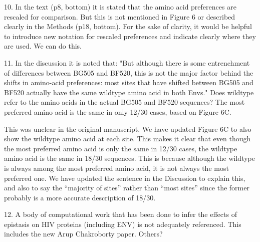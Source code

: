 \documentclass[11pt, oneside]{article}   	%
\begin{document}
10. In the text (p8, bottom) it is stated that the amino acid preferences are rescaled for comparison. But this is not mentioned in Figure 6 or described clearly in the Methods (p18, bottom). For the sake of clarity, it would be helpful to introduce new notation for rescaled preferences and indicate clearly where they are used. 
{\color{red}
We can do this.}

11. In the discussion it is noted that: "But although there is some entrenchment of differences between BG505 and BF520, this is not the major factor behind the shifts in amino-acid preferences: most sites that have shifted between BG505 and BF520 actually have the same wildtype amino acid in both Envs." Does wildtype refer to the amino acids in the actual BG505 and BF520 sequences? The most preferred amino acid is the same in only 12/30 cases, based on Figure 6C. 

{\color{black}
This was unclear in the original manuscript.
We have updated Figure 6C to also show the wildtype amino acid at each site.
This makes it clear that even though the most preferred amino acid is only the same in 12/30 cases, the wildtype amino acid is the same in 18/30 sequences.
This is because although the wildtype is always among the most preferred amino acid, it is not always the most preferred one.
We have updated the sentence in the Discussion to explain this, and also to say the ``majority of sites'' rather than ``most sites'' since the former probably is a more accurate description of 18/30.}

12. A body of computational work that has been done to infer the effects of epistasis on HIV proteins (including ENV) is not adequately referenced. 
{\color{red}
This includes the new Arup Chakroborty paper. Others?}
\end{document}

